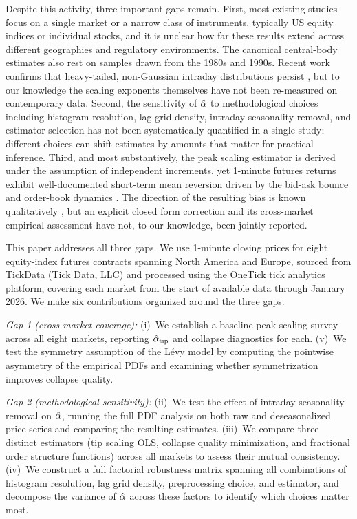 \documentclass[conference]{IEEEtran}
\begin{document}
Despite this activity, three important gaps remain. First, most existing
studies focus on a single market or a narrow class of instruments, typically
US equity indices or individual stocks, and it is unclear how far these results extend across different
geographies and regulatory environments. The canonical central-body estimates
also rest on samples drawn from the 1980s and 1990s. Recent work confirms that
heavy-tailed, non-Gaussian intraday distributions persist
\cite{Masoliver2021,ContMiami2023}, but to our knowledge the scaling exponents
themselves have not been re-measured on contemporary data. Second, the sensitivity of $\hat{\alpha}$ to methodological
choices including histogram resolution, lag grid density, intraday
seasonality removal, and estimator selection has not been systematically
quantified in a single study; different choices can shift estimates by
amounts that matter for practical inference. Third, and most substantively,
the peak scaling estimator is derived under the assumption of independent
increments, yet 1-minute futures returns exhibit well-documented short-term
mean reversion driven by the bid-ask bounce and order-book dynamics
\cite{Roll1984,Bouchaud2004,ClinetPotiron2021,Yegon2025}. The direction of the resulting bias is
known qualitatively \cite{BouchaudPotters2003}, but an explicit
closed form correction and its cross-market empirical assessment
have not, to our knowledge, been jointly reported.

This paper addresses all three gaps. We use 1-minute closing prices for eight
equity-index futures contracts spanning North America and Europe, sourced from
TickData (Tick Data, LLC) and processed using the OneTick tick analytics
platform, covering each market from the start of available data through
January 2026. We make six contributions organized around the three gaps.

\textit{Gap 1 (cross-market coverage):}
(i)~We establish a baseline peak scaling survey across all eight markets,
reporting $\hat{\alpha}_{\mathrm{tip}}$ and collapse diagnostics for each.
(v)~We test the symmetry assumption of the Lévy model by computing the
pointwise asymmetry of the empirical PDFs and examining whether symmetrization
improves collapse quality.

\textit{Gap 2 (methodological sensitivity):}
(ii)~We test the effect of intraday seasonality removal on $\hat{\alpha}$, running
the full PDF analysis on both raw and deseasonalized price series and
comparing the resulting estimates.
(iii)~We compare three distinct estimators (tip scaling OLS,
collapse quality minimization, and fractional order structure functions)
across all markets to assess their mutual consistency.
(iv)~We construct a full factorial robustness matrix spanning all combinations
of histogram resolution, lag grid density, preprocessing choice, and
estimator, and decompose the variance of $\hat{\alpha}$ across these factors to
identify which choices matter most.
\end{document}
